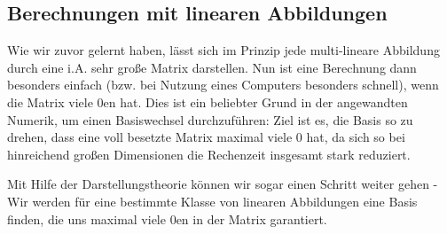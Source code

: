 \subsection{Berechnungen mit linearen Abbildungen}
Wie wir zuvor gelernt haben, lässt sich im Prinzip jede multi-lineare Abbildung durch eine i.A. sehr große Matrix darstellen. Nun ist eine Berechnung dann besonders einfach (bzw. bei Nutzung eines Computers besonders schnell), wenn die Matrix viele 0en hat. Dies ist ein beliebter Grund in der angewandten Numerik, um einen Basiswechsel durchzuführen: Ziel ist es, die Basis so zu drehen, dass eine voll besetzte Matrix maximal viele 0 hat, da sich so bei hinreichend großen Dimensionen die Rechenzeit insgesamt stark reduziert. 

Mit Hilfe der Darstellungstheorie können wir sogar einen Schritt weiter gehen - Wir werden für eine bestimmte Klasse von linearen Abbildungen eine Basis finden, die uns maximal viele 0en in der Matrix garantiert.

